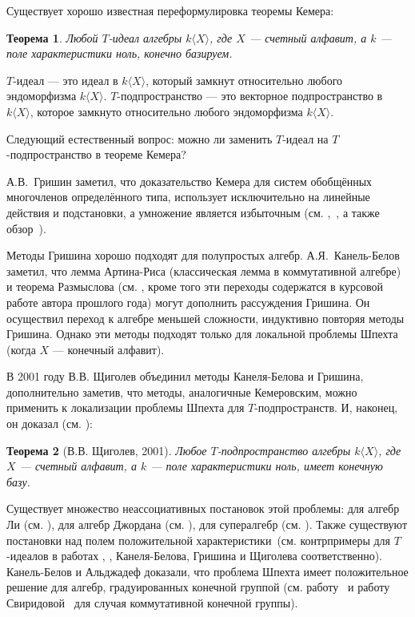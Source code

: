 \documentclass[12pt,a4paper]{article}
\newtheorem*{theorem*}{Теорема}[section]
\begin{document}
    Существует хорошо известная переформулировка теоремы Кемера:

    \vskip 0.1in\noindent
    \begin{theorem*}
        Любой $T$-идеал алгебры $k\langle X\rangle$, где $X$ — счетный алфавит, а $k$ — поле характеристики ноль, конечно базируем.
    \end{theorem*}
    \vskip 0.1in\noindent

    $T$-идеал — это идеал в $k\langle X\rangle$, который замкнут относительно любого эндоморфизма $k\langle X\rangle$.
    $T$-подпространство — это векторное подпространство в $k\langle X\rangle$, которое замкнуто относительно любого эндоморфизма $k\langle X\rangle$.

    Следующий естественный вопрос: можно ли заменить $T$-идеал на $T$-подпространство в теореме Кемера?

    А.В.\ Гришин заметил, что доказательство Кемера для систем обобщённых многочленов определённого типа, использует исключительно на линейные действия и подстановки, а умножение является избыточным (см. \cite{Grishin},~\cite{Grishin2}, а также обзор~\cite{GrishinSchigolev}).

    Методы Гришина хорошо подходят для полупростых алгебр.
    А.Я.\ Канель-Белов заметил, что лемма Артина-Риса (классическая лемма в коммутативной алгебре) и теорема Размыслова (см. \cite{GrishinSchigolev},  кроме того эти переходы содержатся в курсовой работе автора прошлого года) могут дополнить рассуждения Гришина.
    Он осуществил переход к алгебре меньшей сложности, индуктивно повторяя методы Гришина.
    Однако эти методы подходят только для локальной проблемы Шпехта (когда $X$ — конечный алфавит).

    В 2001 году В.В. Щиголев объединил методы Канеля-Белова и Гришина, дополнительно заметив, что методы, аналогичные Кемеровским, можно применить к локализации проблемы Шпехта для $T$-подпространств.
    И, наконец, он доказал (см. \cite{Shchigolev}):
    \vskip 0.1in\noindent
    \begin{theorem*} [В.В. Щиголев, 2001]
        Любое $T$-подпространство алгебры $k\langle X\rangle$, где $X$ — счетный алфавит, а $k$ — поле характеристики ноль, имеет конечную базу.
    \end{theorem*}
    \vskip 0.1in\noindent

    Существует множество неассоциативных постановок этой проблемы: для алгебр Ли (см. \cite{Lie}), для алгебр Джордана (см. \cite{Jordan}), для супералгебр (см. \cite{Super}).
    Также существуют постановки над полем положительной характеристики\ (см. контрпримеры для $T$-идеалов в работах \cite{ConterKanel}, \cite{ConterGrishin}, \cite{ConterShchigolev} Канеля-Белова, Гришина и Щиголева соответственно).
    Канель-Белов и Альджадеф доказали, что проблема Шпехта имеет положительное решение для алгебр, градуированных конечной группой (см. работу~\cite{GradedKanel} и работу Свиридовой~\cite{GradedSviridova} для случая коммутативной конечной группы).
\end{document}
